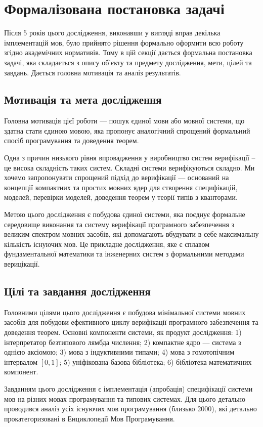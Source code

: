 \section{Формалізована постановка задачі}
Після 5 років цього дослідження, виконавши у вигляді вправ декілька імплементацій мов,
було прийнято рішення формально оформити всю роботу згідно академічних нормативів.
Тому в цій секції дається формальна постановка задачі, яка складається з опису
об'єкту та предмету дослідження, мети, цілей та завдань.
Дається головна мотивація та аналіз результатів.

\subsection{Мотивація та мета дослідження}
Головна мотивація цієї роботи --- пошук єдиної мови або мовної системи, що здатна стати єдиною мовою,
яка пропонує аналогічний спрощений формальний спосіб програмування та доведення теорем.

Одна з причин низького рівня впровадження у виробництво систем
верифікації -- це висока складність таких систем. Складні системи
верифікуються складно. Ми хочемо запропонувати спрощений
підхід до верифікації --- оснований на концепції компактних
та простих мовних ядер для створення специфікацій, моделей,
перевірки моделей, доведення теорем у теорії типів з кванторами.

Метою цього дослідження є побудова єдиної системи, яка поєднує формальне середовище
виконання та систему верифікації програмного забезпечення з великим спектром мовних
засобів, які допомагають вбудувати в себе максимальну кількість існуючих мов.
Це прикладне дослідження, яке є сплавом фундаментальної математики та інженерних
систем з формальними методами верицікації.

\subsection{Цілі та завдання дослідження}
Головними цілями цього дослідження є побудова мінімальної системи
мовних засобів для побудови ефективного циклу верифікації програмного
забезпечення та доведення теорем. Основні компоненти системи, як продукт дослідження:
1) інтерпретатор безтипового лямбда числення;
2) компактне ядро --- система з однією аксіомою;
3) мова з індуктивними типами;
4) мова з гомотопічним інтервалом $[0,1]$;
5) уніфікована базова бібліотека;
6) бібліотека математичних компонент.

Завданням цього дослідження є імплементація (апробація)
специфікації системи мов на різних мовах програмування та типових системах.
Для цього детально проводився аналіз усіх існуючих мов
програмування (близько 2000), які детально прокатегоризовані
в Енциклопедії Мов Програмування.

